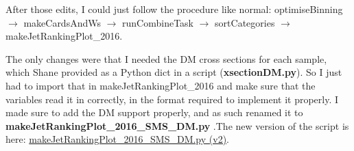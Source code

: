 After those edits, I could just follow the procedure like normal: optimiseBinning $\rightarrow$ makeCardsAndWs $\rightarrow$ runCombineTask $\rightarrow$ sortCategories $\rightarrow$ makeJetRankingPlot\_2016.

The only changes were that I needed the DM cross sections for each sample, which Shane provided as a Python dict in a script (\textbf{xsectionDM.py}). So I just had to import that in makeJetRankingPlot\_2016 and make sure that the variables read it in correctly, in the format required to implement it properly. I made sure to add the DM support properly, and as such renamed it to \textbf{makeJetRankingPlot\_2016\_SMS\_DM.py} .The new version of the script is here: \href{run:modules/Sec 23 - Signal model analyses for SUS-16-038listings//makeJetRankingPlot_2016_SMS_DMv2.py}{makeJetRankingPlot\_2016\_SMS\_DM.py (v2)}.
